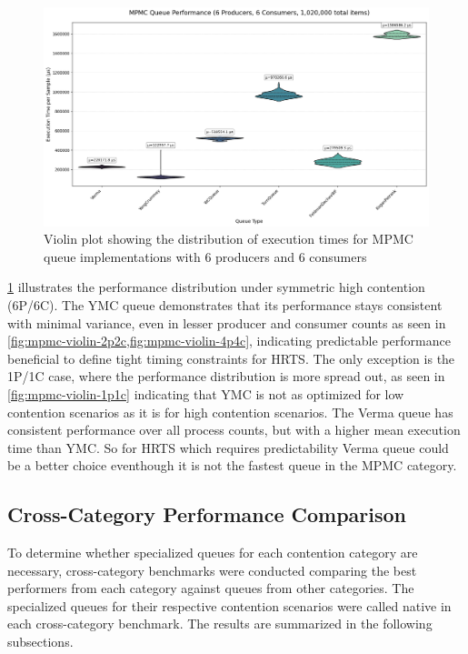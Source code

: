 \begin{figure}[htb]
\centering
\caption{Violin plot showing the distribution of execution times for MPMC queue implementations with 6 producers and 6 consumers}
\label{fig:mpmc-violin-6p6c}
\includegraphics[width=\textwidth]{images/results/mpmc_performance_violin_6P_6C.png}
\end{figure}

\cref{fig:mpmc-violin-6p6c} illustrates the performance distribution under symmetric high contention (6P/6C). The \ac{YMC} queue demonstrates that its performance stays consistent with minimal variance, even in lesser producer and consumer counts as seen in \cref{fig:mpmc-violin-2p2c,fig:mpmc-violin-4p4c}, indicating predictable performance beneficial to define tight timing constraints for \ac{HRTS}. The only exception is the 1P/1C case, where the performance distribution is more spread out, as seen in \cref{fig:mpmc-violin-1p1c} indicating that \ac{YMC} is not as optimized for low contention scenarios as it is for high contention scenarios. The Verma queue has consistent performance over all process counts, but with a higher mean execution time than \ac{YMC}. So for \ac{HRTS} which requires predictability Verma queue could be a better choice eventhough it is not the fastest queue in the \ac{MPMC} category.

\subsection{Cross-Category Performance Comparison}
To determine whether specialized queues for each contention category are necessary, cross-category benchmarks were conducted comparing the best performers from each category against queues from other categories. The specialized queues for their respective contention scenarios were called native in each cross-category benchmark. The results are summarized in the following subsections.

